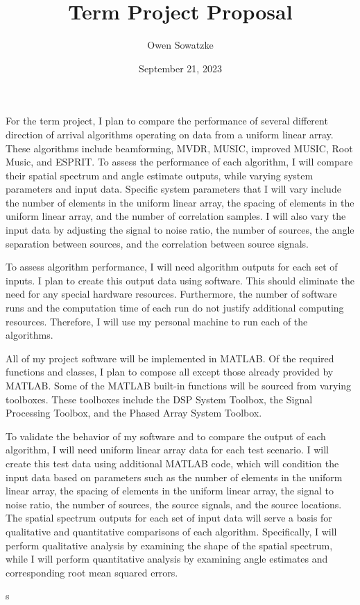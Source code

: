 \documentclass{article}
\title{Term Project Proposal}
\author{Owen Sowatzke}
\date{September 21, 2023}
\begin{document}
	\maketitle

	For the term project, I plan to compare the performance of several different direction of arrival algorithms operating on data from a uniform linear array. These algorithms include beamforming, MVDR, MUSIC, improved MUSIC, Root Music, and ESPRIT. To assess the performance of each algorithm, I will compare their spatial spectrum and angle estimate outputs, while varying system parameters and input data. Specific system parameters that I will vary include the number of elements in the uniform linear array, the spacing of elements in the uniform linear array, and the number of correlation samples. I will also vary the input data by adjusting the signal to noise ratio, the number of sources, the angle separation between sources, and the correlation between source signals.
	
	To assess algorithm performance, I will need algorithm outputs for each set of inputs. I plan to create this output data using software. This should eliminate the need for any special hardware resources. Furthermore, the number of software runs and the computation time of each run do not justify additional computing resources. Therefore, I will use my personal machine to run each of the algorithms.
	
	All of my project software will be implemented in MATLAB. Of the required functions and classes, I plan to compose all except those already provided by MATLAB. Some of the MATLAB built-in functions will be sourced from varying toolboxes. These toolboxes include the DSP System Toolbox, the Signal Processing Toolbox, and the Phased Array System Toolbox.
	
	To validate the behavior of my software and to compare the output of each algorithm, I will need uniform linear array data for each test scenario. I will create this test data using additional MATLAB code, which will condition the input data based on parameters such as the number of elements in the uniform linear array, the spacing of elements in the uniform linear array, the signal to noise ratio, the number of sources, the source signals, and the source locations. The spatial spectrum outputs for each set of input data will serve a basis for qualitative and quantitative comparisons of each algorithm. Specifically, I will perform qualitative analysis by examining the shape of the spatial spectrum, while I will perform quantitative analysis by examining angle estimates and corresponding root mean squared errors.
	
	\nocite{doa_algorithms_raghu}
	\nocite{mvdr_montlouis}
	\nocite{capon_sanudin}
	\nocite{music_chowdhury}
	\nocite{improved_music_gupta}
	\nocite{root_music_esprit_patwari}
	\nocite{esprit_ning}
	\newpage
	{}
	s
\end{document}
